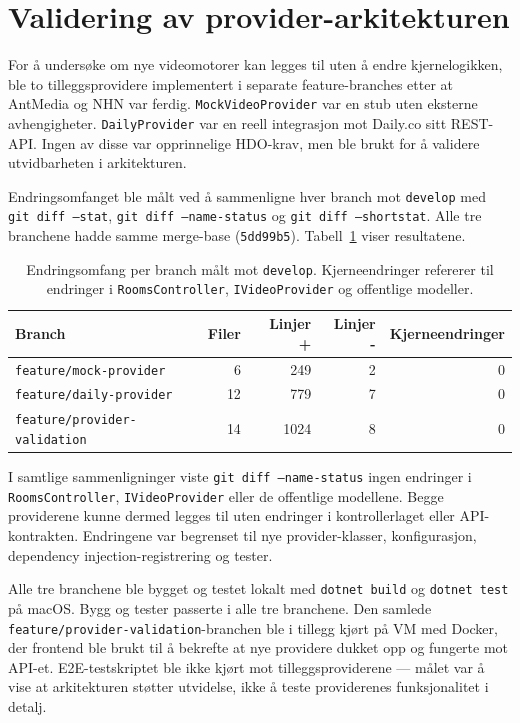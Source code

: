 \section{Validering av provider-arkitekturen}
\label{sec:provider-validering}

For å undersøke om nye videomotorer kan legges til uten å endre
kjernelogikken, ble to tilleggsprovidere implementert i separate
feature-branches etter at AntMedia og NHN var ferdig.
\texttt{MockVideoProvider} var en stub uten eksterne avhengigheter.
\texttt{DailyProvider} var en reell integrasjon mot Daily.co sitt
REST-API. Ingen av disse var opprinnelige HDO-krav, men ble brukt
for å validere utvidbarheten i arkitekturen.

Endringsomfanget ble målt ved å sammenligne hver branch mot
\texttt{develop} med \texttt{git diff --stat},
\texttt{git diff --name-status} og \texttt{git diff --shortstat}.
Alle tre branchene hadde samme merge-base (\texttt{5dd99b5}).
Tabell~\ref{tab:provider-validering} viser resultatene.

\begin{table}[h]
\centering
\begin{tabular}{lrrrr}
\toprule
\textbf{Branch} & \textbf{Filer} & \textbf{Linjer +} &
\textbf{Linjer -} & \textbf{Kjerneendringer} \\
\midrule
\texttt{feature/mock-provider}       & 6  & 249  & 2 & 0 \\
\texttt{feature/daily-provider}      & 12 & 779  & 7 & 0 \\
\texttt{feature/provider-validation} & 14 & 1024 & 8 & 0 \\
\bottomrule
\end{tabular}
\caption{Endringsomfang per branch målt mot \texttt{develop}.
Kjerneendringer refererer til endringer i \texttt{RoomsController},
\texttt{IVideoProvider} og offentlige modeller.}
\label{tab:provider-validering}
\end{table}

I samtlige sammenligninger viste \texttt{git diff --name-status}
ingen endringer i \texttt{RoomsController}, \texttt{IVideoProvider}
eller de offentlige modellene. Begge providerene kunne dermed legges
til uten endringer i kontrollerlaget eller API-kontrakten.
Endringene var begrenset til nye provider-klasser, konfigurasjon,
dependency injection-registrering og tester.

Alle tre branchene ble bygget og testet lokalt med
\texttt{dotnet build} og \texttt{dotnet test} på macOS. Bygg og
tester passerte i alle tre branchene. Den samlede
\texttt{feature/provider-validation}-branchen ble i tillegg kjørt
på VM med Docker, der frontend ble brukt til å bekrefte at nye
providere dukket opp og fungerte mot API-et. E2E-testskriptet ble
ikke kjørt mot tilleggsproviderene — målet var å vise at
arkitekturen støtter utvidelse, ikke å teste providerenes
funksjonalitet i detalj.